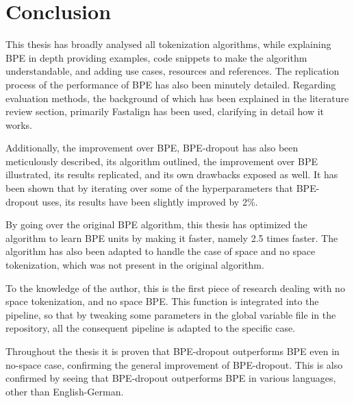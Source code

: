 %
%

\chapter{Conclusion}\label{ch:conclusion}

This thesis has broadly analysed all tokenization algorithms, while explaining BPE in depth providing examples, code snippets to make the algorithm understandable, and adding use cases, resources and references. The replication process of the performance of BPE has also been minutely detailed. Regarding evaluation methods, the background of which has been explained in the literature review section, primarily Fastalign has been used, clarifying in detail how it works.

Additionally, the improvement over BPE, BPE-dropout has also been meticulously described, its algorithm outlined, the improvement over BPE illustrated, its results replicated, and its own drawbacks exposed as well. It has been shown that by iterating over some of the hyperparameters that BPE-dropout uses, its results have been slightly improved by 2\%.

By going over the original BPE algorithm, this thesis has optimized the algorithm to learn BPE units by making it faster, namely 2.5 times faster. The algorithm has also been adapted to handle the case of space and no space tokenization, which was not present in the original algorithm.

To the knowledge of the author, this is the first piece of research dealing with no space tokenization, and no space BPE. This function is integrated into the pipeline, so that by tweaking some parameters in the global variable file in the repository, all the consequent pipeline is adapted to the specific case.

Throughout the thesis it is proven that BPE-dropout outperforms BPE even in no-space case, confirming the general improvement of BPE-dropout. This is also confirmed by seeing that BPE-dropout outperforms BPE in various languages, other than English-German.
